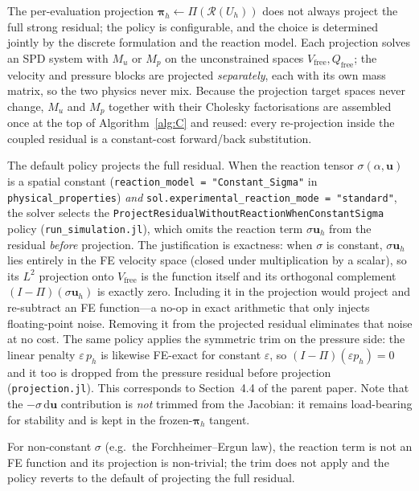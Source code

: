 \documentclass{article}
\newcommand{\code}[1]{\texttt{\small #1}}
\begin{document}
The per-evaluation projection
$\boldsymbol{\pi}_h \gets \Pi(\mathcal{R}(U_h))$ does not always project
the full strong residual; the policy is configurable, and the choice is
determined jointly by the discrete formulation and the reaction model.
Each projection solves an SPD system with $M_u$ or $M_p$ on the
unconstrained spaces $V_{\mathrm{free}}, Q_{\mathrm{free}}$; the velocity
and pressure blocks are projected \emph{separately}, each with its own
mass matrix, so the two physics never mix. Because the projection target
spaces never change, $M_u$ and $M_p$ together with their Cholesky
factorisations are assembled once at the top of Algorithm~\ref{alg:C} and reused:
every re-projection inside the coupled residual is a constant-cost
forward/back substitution.

The default policy projects the full residual. When the reaction tensor
$\sigma(\alpha, \boldsymbol{u})$ is a spatial constant
(\code{reaction\_model = "Constant\_Sigma"} in \code{physical\_properties})
\emph{and} \code{sol.experimental\_reaction\_mode = "standard"}, the solver
selects the \code{ProjectResidualWithoutReactionWhenConstantSigma} policy
(\code{run\_simulation.jl}), which omits the
reaction term $\sigma \boldsymbol{u}_h$ from the residual
\emph{before} projection. The justification is exactness: when $\sigma$
is constant, $\sigma \boldsymbol{u}_h$ lies entirely in the FE velocity
space (closed under multiplication by a scalar), so its $L^2$ projection
onto $V_{\mathrm{free}}$ is the function itself and its orthogonal
complement $(I - \Pi)(\sigma \boldsymbol{u}_h)$ is exactly zero.
Including it in the projection would project and re-subtract an FE
function---a no-op in exact arithmetic that only injects floating-point
noise. Removing it from the projected residual eliminates that noise at
no cost. The same policy applies the symmetric trim on the pressure side:
the linear penalty $\varepsilon\,p_h$ is likewise FE-exact for constant
$\varepsilon$, so $(I-\Pi)(\varepsilon p_h) = 0$ and it too is dropped from
the pressure residual before projection (\code{projection.jl}). This
corresponds to Section~4.4 of the parent paper. Note that
the $-\sigma\,\mathrm{d}\boldsymbol{u}$ contribution is \emph{not}
trimmed from the Jacobian: it remains load-bearing for stability and is
kept in the frozen-$\boldsymbol{\pi}_h$ tangent.

For non-constant $\sigma$ (e.g.\ the Forchheimer--Ergun law), the
reaction term is not an FE function and its projection is non-trivial;
the trim does not apply and the policy reverts to the default of
projecting the full residual.
\end{document}
